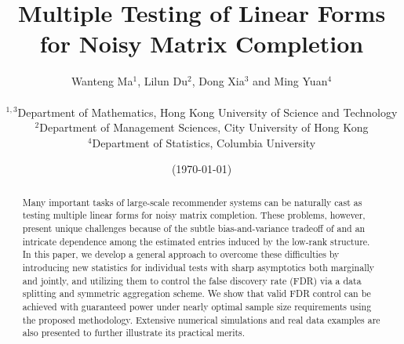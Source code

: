 \documentclass[12pt]{article}
\title{Multiple Testing of Linear Forms for Noisy Matrix Completion}
\author{Wanteng Ma$^1$, Lilun Du$^2$, Dong Xia$^3$ and Ming Yuan$^4$\\
~ \\
$^{1,3}$Department of Mathematics, Hong Kong University of Science and Technology\\
$^2$Department of Management Sciences,  City University of Hong Kong\\
$^4$Department of Statistics,  Columbia University\\
}
\date{(\today)}
\theoremstyle{plain}
\begin{document}
\maketitle


\begin{abstract}
Many important tasks of large-scale recommender systems can be naturally cast as testing multiple linear forms for noisy matrix completion. These problems, however, present unique challenges because of the subtle bias-and-variance tradeoff of and an intricate dependence among the estimated entries induced by the low-rank structure. In this paper, we develop a general approach to overcome these difficulties by introducing new statistics for individual tests with sharp asymptotics both marginally and jointly, and utilizing them to control the false discovery rate (FDR) via a data splitting and symmetric aggregation scheme. We show that valid FDR control can be achieved with guaranteed power under nearly optimal sample size requirements using the proposed methodology. Extensive numerical simulations and real data examples are also presented to further illustrate its practical merits.
\end{abstract}
\end{document}
